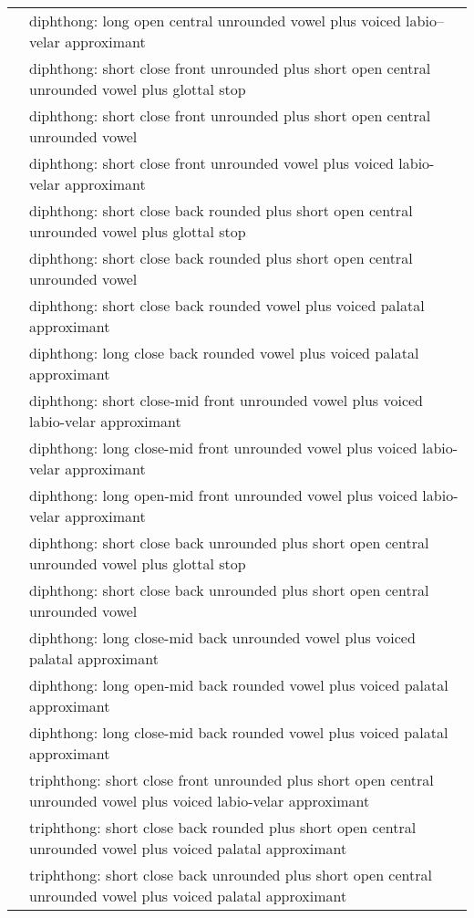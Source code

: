 \documentclass{article}
\begin{document}
\begin{xltabular}{\textwidth}{lL}
   & diphthong: long open central unrounded vowel plus voiced labio–velar approximant\\
   & diphthong: short close front unrounded plus short open central unrounded vowel plus glottal stop \\
   & diphthong: short close front unrounded plus short open central unrounded vowel \\
   & diphthong: short close front unrounded vowel plus voiced labio-velar approximant \\
   & diphthong: short close back rounded plus short open central unrounded vowel plus glottal stop \\
   & diphthong: short close back rounded plus short open central unrounded vowel \\
   & diphthong: short close back rounded vowel plus voiced palatal approximant \\
   & diphthong: long close back rounded vowel plus voiced palatal approximant \\
   & diphthong: short close-mid front unrounded vowel plus voiced labio-velar approximant \\
   & diphthong: long close-mid front unrounded vowel plus voiced labio-velar approximant \\
   & diphthong: long open-mid front unrounded vowel plus voiced labio-velar approximant \\
   & diphthong: short close back unrounded plus short open central unrounded vowel plus glottal stop \\
   & diphthong: short close back unrounded plus short open central unrounded vowel \\
   & diphthong: long close-mid back unrounded vowel plus voiced palatal approximant \\
   & diphthong: long open-mid back rounded vowel plus voiced palatal approximant \\
   & diphthong: long close-mid back rounded vowel plus voiced palatal approximant \\
   & triphthong: short close front unrounded plus short open central unrounded vowel plus voiced labio-velar approximant \\
   & triphthong: short close back rounded plus short open central unrounded vowel plus voiced palatal approximant \\
   & triphthong: short close back unrounded plus short open central unrounded vowel plus voiced palatal approximant \\

\end{xltabular}
\end{document}
